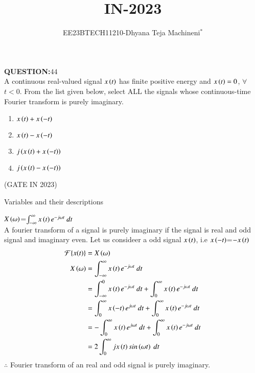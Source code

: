 \documentclass[journal,12pt,twocolumn]{IEEEtran}
\theoremstyle{remark}
\begin{document}

\vspace{3cm}
\title{\textbf{IN-2023}}
\author{EE23BTECH11210-Dhyana Teja Machineni$^{*}$%
}
\maketitle
\newpage
\bigskip

\textbf{QUESTION:$44$}\\
A continuous real-valued signal $x\left(t\right)$ has finite positive energy and $x\left(t\right) = 0$, $\forall$ $t < 0$. From the list given below, select ALL the signals whose
continuous-time Fourier transform is purely imaginary.\\
\begin{enumerate}
\item$x\left(t\right) + x\left(-t\right)$
\item$x\left(t\right) - x\left(-t\right)$
\item$j\left(x\left(t\right) + x\left(-t\right)\right)$
\item$j\left(x\left(t\right) - x\left(-t\right)\right)$
\end{enumerate}
\hfill{(GATE IN 2023)}\\
\solution
\begin{table}[h]
         \label{tab:table}
         
         \caption{Variables and their descriptions}
     \end{table}
$X\left(\omega\right)$=$\int_{-\infty}^{\infty} x\brak{t} e^{-j \omega t} \ dt$\\
A fourier transform of a signal is purely imaginary if the signal is real and odd signal and imaginary even. 
Let us consideer a odd signal $x\left(t\right)$,
i.e $x\left(-t\right)$=$- x\left(t\right)$
\begin{align}
\mathcal{F}\{x(t)\} &= X\brak{\omega}\\
X\brak{\omega}&=\int_{-\infty}^{\infty} x\brak{t} e^{-j \omega t} \ dt\\
&=\int_{-\infty}^{0} x\brak{t} e^{-j \omega t} \ dt+\int_{0}^{\infty} x\brak{t} e^{-j \omega t} \ dt\\
&=\int_{0}^{\infty} x\brak{-t} e^{j \omega t} \ dt+\int_{0}^{\infty} x\brak{t} e^{-j \omega t} \ dt\\
&=-\int_{0}^{\infty} x\brak{t} e^{j \omega t} \ dt+\int_{0}^{\infty} x\brak{t} e^{-j \omega t} \ dt\\
&=2\int_{0}^{\infty} j x\brak{t} sin\brak{\omega t}  \ dt\\
\end{align}
$\therefore$ Fourier transform of an real and odd signal is purely imaginary.\\
\end{document}
